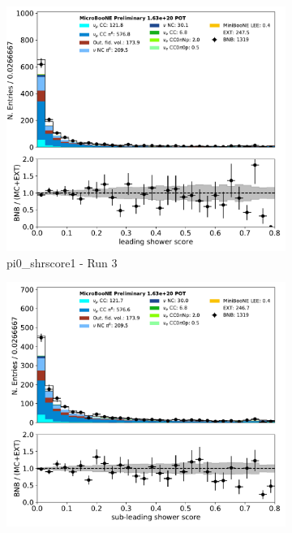 \documentclass[a4paper]{article}
\begin{document}
\begin{figure}[H] 
\begin{center}
    \begin{subfigure}[b]{0.3\textwidth}
    \centering
    \includegraphics[width=1.00\textwidth]{pi0/pi0_shrscore1_01152020_inputs_RUN3.pdf}
    \caption{\label{fig:pi0:inputs:shrscore1:RUN3} pi0\_shrscore1 - Run 3}
    \end{subfigure}
    \begin{subfigure}[b]{0.3\textwidth}
    \centering
    \includegraphics[width=1.00\textwidth]{pi0/pi0_shrscore2_01152020_inputs_RUN3.pdf}

\end{subfigure}
\end{center}
\end{figure}
\end{document}

